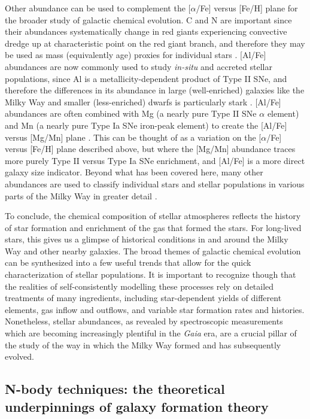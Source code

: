 Other abundance can be used to complement the [$\alpha$/Fe] versus [Fe/H] plane for the broader study of galactic chemical evolution. C and N are important since their abundances systematically change in red giants experiencing convective dredge up at characteristic point on the red giant branch, and therefore they may be used as mass (equivalently age) proxies for individual stars \parencite[e.g.][]{martig16,mackereth19a}. [Al/Fe] abundances are now commonly used to study \textit{in-situ} and accreted stellar populations, since Al is a metallicity-dependent product of Type II SNe, and therefore the differences in its abundance in large (well-enriched) galaxies like the Milky Way and smaller (less-enriched) dwarfs is particularly stark \parencite[e.g.][]{hawkins15,das20,belokurov22}. [Al/Fe] abundances are often combined with Mg (a nearly pure Type II SNe $\alpha$ element) and Mn (a nearly pure Type Ia SNe iron-peak element) to create the [Al/Fe] versus [Mg/Mn] plane \parencite[e.g.][]{hawkins15,das20,horta21a,fernandez23}. This can be thought of as a variation on the [$\alpha$/Fe] versus [Fe/H] plane described above, but where the [Mg/Mn] abundance traces more purely Type II versus Type Ia SNe enrichment, and [Al/Fe] is a more direct galaxy size indicator. Beyond what has been covered here, many other abundances are used to classify individual stars and stellar populations in various parts of the Milky Way in greater detail \parencite[e.g. see][]{frebel15,barbuy18}. 

To conclude, the chemical composition of stellar atmospheres reflects the history of star formation and enrichment of the gas that formed the stars. For long-lived stars, this gives us a glimpse of historical conditions in and around the Milky Way and other nearby galaxies. The broad themes of galactic chemical evolution can be synthesized into a few useful trends that allow for the quick characterization of stellar populations. It is important to recognize though that the realities of self-consistently modelling these processes rely on detailed treatments of many ingredients, including star-dependent yields of different elements, gas inflow and outflows, and variable star formation rates and histories. Nonetheless, stellar abundances, as revealed by spectroscopic measurements which are becoming increasingly plentiful in the \textit{Gaia} era, are a crucial pillar of the study of the way in which the Milky Way formed and has subsequently evolved.

\subsection{N-body techniques: the theoretical underpinnings of galaxy formation theory}

